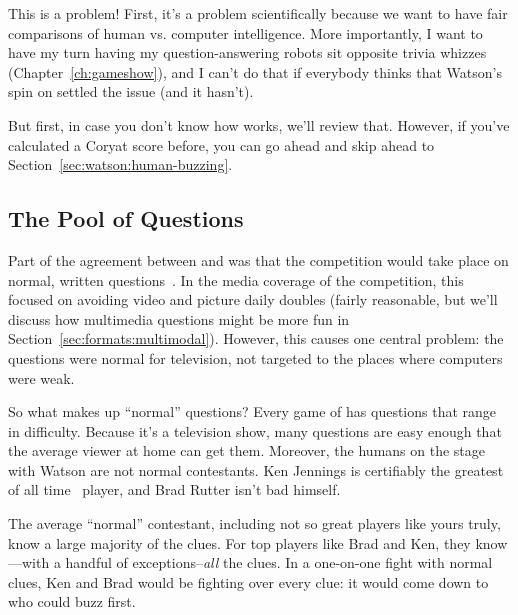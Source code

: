 This is a problem!  First, it's a problem scientifically because we
want to have fair comparisons of human vs. computer intelligence.
%
More importantly, I want to have my turn having my question-answering
robots sit opposite trivia whizzes (Chapter~\ref{ch:gameshow}),
and I can't do that if everybody thinks that Watson's spin
on \jeopardy{} settled the issue (and it hasn't).


But first, in case you don't know how \jeopardy{} works, we'll review
that.
%
However, if you've calculated a Coryat score before, you can go ahead
and skip ahead to Section~\ref{sec:watson:human-buzzing}.


\subsection{The Pool of Questions}

Part of the agreement between \jeopardy{} and  was that the
competition would take place on normal, written questions~\citep{jennings2011ibm}.
%
In the media coverage of the competition, this focused on avoiding
video and picture daily doubles (fairly reasonable, but we'll discuss
how multimedia questions might be more fun in Section~\ref{sec:formats:multimodal}).
%
However, this causes one central problem: the questions were normal for
television, not targeted to the places where computers were weak.

So what makes up ``normal'' questions?
%
Every game of \jeopardy{} has questions that range in difficulty.
%
Because it's a television show, many questions are easy enough that
the average viewer at home can get them.
%
Moreover, the humans on the stage with Watson are not normal contestants.
%
Ken Jennings is certifiably the greatest of all
time~\citep[]{low-20} \jeopardy{} player, and Brad Rutter
isn't bad himself.

The average ``normal'' \jeopardy{} contestant, including not so great
players like yours truly, know a large majority of the clues.
%
For top players like Brad and Ken, they know---with a handful of
exceptions--\emph{all} the clues.
%
In a one-on-one fight with normal clues, Ken and Brad would be fighting over
every clue: it would come down to who could buzz first.

